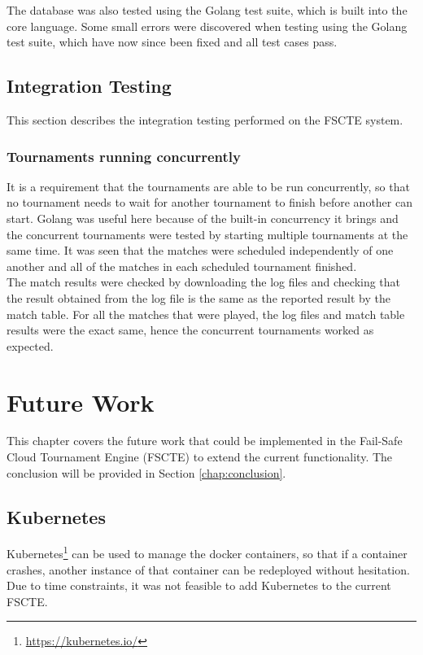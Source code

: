 \documentclass[a4paper, 11pt]{report}
\begin{document}
The database was also tested using the Golang test suite, which is built into
the core language. Some small errors were discovered when testing using the
Golang test suite, which have now since been fixed and all test cases pass.

\section{Integration Testing}
\label{sec:integ-test}

This section describes the integration testing performed on the FSCTE system.

\subsection{Tournaments running concurrently}

It is a requirement that the tournaments are able to be run concurrently, so
that no tournament needs to wait for another tournament to finish before another
can start. Golang was useful here because of the built-in concurrency it brings
and the concurrent tournaments were tested by starting multiple tournaments at
the same time. It was seen that the matches were scheduled independently of one
another and all of the matches in each scheduled tournament finished. \\

The match results were checked by downloading the log files and checking that the
result obtained from the log file is the same as the reported result by the match
table. For all the matches that were played, the log files and match table results
were the exact same, hence the concurrent tournaments worked as expected.

\chapter{Future Work}
\label{chap:future}

This chapter covers the future work that could be implemented in the Fail-Safe
Cloud Tournament Engine (FSCTE) to extend the current functionality. The
conclusion will be provided in Section \ref{chap:conclusion}.

\section{Kubernetes}

Kubernetes\footnote{\url{https://kubernetes.io/}} can be used to manage the docker
containers, so that if a container crashes, another instance of that container
can be redeployed without hesitation. Due to time constraints, it was not feasible
to add Kubernetes to the current FSCTE.
\end{document}
